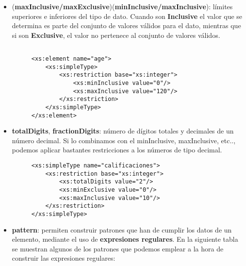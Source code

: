 \begin{itemize}
    \item (\textbf{maxInclusive/maxExclusive})(\textbf{minInclusive/maxInclusive}): límites superiores e inferiores del tipo de dato. Cuando son \textbf{Inclusive} el valor que se determina es parte del conjunto de valores válidos para el dato, mientras que si son \textbf{Exclusive}, el valor no pertenece al conjunto de valores válidos.

    \begin{figure}[H]
        \begin{tcolorbox}[sharp corners, colback=yellow!30, colframe=white!20]
            \scriptsize
            \begin{verbatim}

<xs:element name="age">
    <xs:simpleType>
        <xs:restriction base="xs:integer">
            <xs:minInclusive value="0"/>
            <xs:maxInclusive value="120"/>
        </xs:restriction>
    </xs:simpleType>
</xs:element>
            \end{verbatim}
        \end{tcolorbox}
    \end{figure}


    \item \textbf{totalDigits}, \textbf{fractionDigits}: número de dígitos totales y decimales de un número decimal. Si lo combinamos con el minInclusive, maxInclusive, etc.., podemos aplicar bastantes restricciones a los números de tipo decimal.

    \begin{figure}[H]
        \begin{tcolorbox}[sharp corners, colback=yellow!30, colframe=white!20]
            \scriptsize
            \begin{verbatim}
<xs:simpleType name="calificaciones">
    <xs:restriction base="xs:integer">
        <xs:totalDigits value="2"/>
        <xs:minExclusive value="0"/>
        <xs:maxInclusive value="10"/>
    </xs:restriction>
</xs:simpleType>
            \end{verbatim}
        \end{tcolorbox}
    \end{figure}

    \item \textbf{pattern}: permiten construir patrones que han de cumplir los datos de un elemento, mediante el uso de \textbf{expresiones regulares}. En la siguiente tabla se muestran algunos de los patrones que podemos emplear a la hora de construir las expresiones regulares:


\end{itemize}
